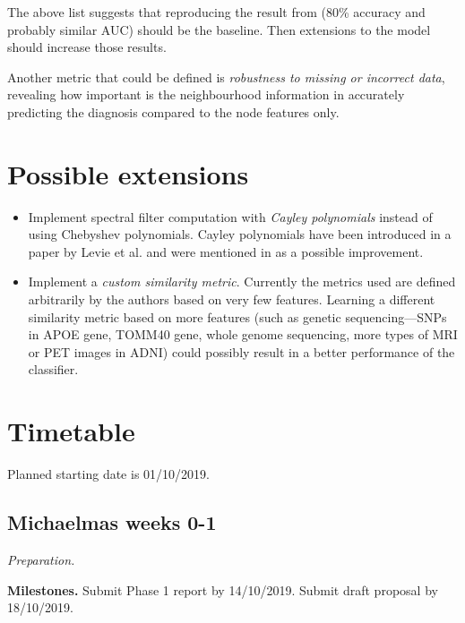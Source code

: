 \documentclass[12pt,a4paper,twoside]{article}
\begin{document}
The above list suggests that reproducing the result from \cite{parisot2018disease} (80\% accuracy and probably similar AUC) should be the baseline. Then extensions to the model should increase those results.

Another metric that could be defined is \textit{robustness to missing or incorrect data}, revealing how important is the neighbourhood information in accurately predicting the diagnosis compared to the node features only.

\section*{Possible extensions}
\begin{itemize}
  \item Implement spectral filter computation with \textit{Cayley polynomials} instead of using Chebyshev polynomials. Cayley polynomials have been introduced in a paper by Levie et al. \cite{levie2017cayleynets} and were mentioned in \cite{parisot2018disease} as a possible improvement.
  \item Implement a \textit{custom similarity metric}. Currently the metrics used are defined arbitrarily by the authors based on very few features. Learning a different similarity metric based on more features (such as genetic sequencing—SNPs in APOE gene, TOMM40 gene, whole genome sequencing, more types of MRI or PET images in ADNI) could possibly result in a better performance of the classifier.
\end{itemize}


\section*{Timetable}
\label{section:timetable}


Planned starting date is 01/10/2019.

\subsection*{Michaelmas weeks 0-1}
\textit{Preparation.}

\textbf{Milestones.} Submit Phase 1 report by 14/10/2019. Submit draft proposal by 18/10/2019.
\end{document}
